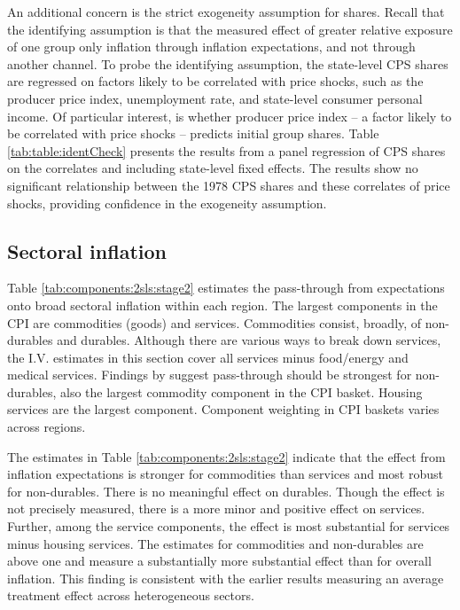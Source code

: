 \documentclass[12pt]{article}
\begin{document}
An additional concern is the strict exogeneity assumption for shares. Recall that the identifying assumption is that the measured effect of greater relative exposure of one group only inflation through inflation expectations, and not through another channel.  To probe the identifying assumption, the state-level CPS shares are regressed on factors likely to be correlated with price shocks, such as the producer price index, unemployment rate, and state-level consumer personal income. Of particular interest, is whether producer price index -- a factor likely to be correlated with price shocks -- predicts initial group shares.  Table \ref{tab:table:identCheck} presents the results from a panel regression of CPS shares on the correlates and including state-level fixed effects.  The results show no significant relationship between the 1978 CPS shares and these correlates of price shocks, providing confidence in the exogeneity assumption.

\subsection{Sectoral inflation}

Table \ref{tab:components:2sls:stage2} estimates the pass-through from expectations onto broad sectoral inflation within each region. The largest components in the CPI are commodities (goods) and services. Commodities consist, broadly, of non-durables and durables. Although there are various ways to break down services, the I.V. estimates in this section cover all services minus food/energy and medical services. Findings by \cite{Dacunto:groceryJPE} suggest pass-through should be strongest for non-durables, also the largest commodity component in the CPI basket. Housing services are the largest component. Component weighting in CPI baskets varies across regions.



The estimates in Table \ref{tab:components:2sls:stage2} indicate that the effect from inflation expectations is stronger for commodities than services and most robust for non-durables. There is no meaningful effect on durables. Though the effect is not precisely measured, there is a more minor and positive effect on services. Further, among the service components, the effect is most substantial for services minus housing services. The estimates for commodities and non-durables are above one and measure a substantially more substantial effect than for overall inflation. This finding is consistent with the earlier results measuring an average treatment effect across heterogeneous sectors.
\end{document}
